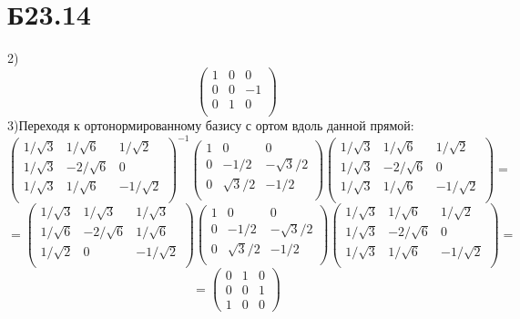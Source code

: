 \section*{Б23.14}
2)$$\begin{pmatrix*}
    1&0&0\\
    0&0&-1\\
    0&1&0\\
\end{pmatrix*}$$
3)Переходя к ортонормированному базису с ортом вдоль данной прямой:
$$\begin{pmatrix*}
    1/\sqrt{3}&1/\sqrt{6}&1/\sqrt{2}\\
    1/\sqrt{3}&-2/\sqrt{6}&0\\
    1/\sqrt{3}&1/\sqrt{6}&-1/\sqrt{2}\\
\end{pmatrix*}^{-1}\begin{pmatrix*}
    1&0&0\\
    0&-1/2&-\sqrt{3}/2\\
    0&\sqrt{3}/2&-1/2\\
\end{pmatrix*}\begin{pmatrix*}
    1/\sqrt{3}&1/\sqrt{6}&1/\sqrt{2}\\
    1/\sqrt{3}&-2/\sqrt{6}&0\\
    1/\sqrt{3}&1/\sqrt{6}&-1/\sqrt{2}\\
\end{pmatrix*}=$$
$$=\begin{pmatrix*}
    1/\sqrt{3}&1/\sqrt{3}&1/\sqrt{3}\\
    1/\sqrt{6}&-2/\sqrt{6}&1/\sqrt{6}\\
    1/\sqrt{2}&0&-1/\sqrt{2}\\
\end{pmatrix*}\begin{pmatrix*}
    1&0&0\\
    0&-1/2&-\sqrt{3}/2\\
    0&\sqrt{3}/2&-1/2\\
\end{pmatrix*}\begin{pmatrix*}
    1/\sqrt{3}&1/\sqrt{6}&1/\sqrt{2}\\
    1/\sqrt{3}&-2/\sqrt{6}&0\\
    1/\sqrt{3}&1/\sqrt{6}&-1/\sqrt{2}\\
\end{pmatrix*}=$$
$$=\begin{pmatrix*}
    0&1&0\\
    0&0&1\\
    1&0&0
\end{pmatrix*}$$
